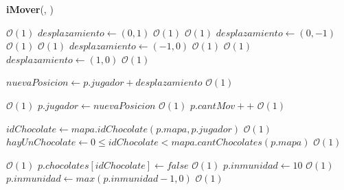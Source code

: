 \documentclass{book}
\newcommand{\bigO}{\mathcal{O}}
\begin{document}
\begin{Algoritmos}
    \newpage

    \begin{algorithm}[H]{\textbf{iMover}(, )}
        \begin{algorithmic}[1]
                                                                           \Comment $\bigO(1)$
                    \State $desplazamiento \gets (0,1)$                                     \Comment $\bigO(1)$
                \EndIf
                                                                            \Comment $\bigO(1)$
                    \State $desplazamiento \gets (0,-1)$                                    \Comment $\bigO(1)$
                \EndIf
                                                                        \Comment $\bigO(1)$
                    \State $desplazamiento \gets (-1,0)$                                    \Comment $\bigO(1)$
                \EndIf
                                                                          \Comment $\bigO(1)$
                    \State $desplazamiento \gets (1,0)$                                     \Comment $\bigO(1)$
                \EndIf

                \State $nuevaPosicion \gets p.jugador + desplazamiento$                     \Comment $\bigO(1)$

                  \Comment $\bigO(1)$
                    \State $p.jugador \gets nuevaPosicion$                                                     \Comment $\bigO(1)$
                    \State $p.cantMov++$                                                                    \Comment $\bigO(1)$

                    \State $idChocolate \gets mapa.idChocolate(p.mapa, p.jugador)$                          \Comment $\bigO(1)$
                    \State $hayUnChocolate \gets 0 \leq idChocolate < mapa.cantChocolates(p.mapa)$          \Comment $\bigO(1)$

                                                    \Comment $\bigO(1)$
                        \State $p.chocolates[idChocolate] \gets false$                                      \Comment $\bigO(1)$
                        \State $p.inmunidad \gets 10$                                                       \Comment $\bigO(1)$
                    \Else
                        \State $p.inmunidad \gets max(p.inmunidad - 1, 0)$                                  \Comment $\bigO(1)$
                    \EndIf


\end{algorithmic}
\end{algorithm}
\end{Algoritmos}
\end{document}
